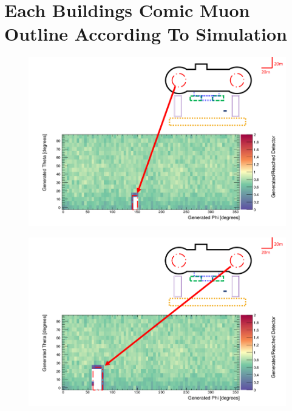 
\chapter{Each Buildings Comic Muon Outline According To Simulation}

\begin{figure}[htbp]
 \centering
 \includegraphics[width=\linewidth]{Chapter5/Figs/wylfaRasterNew/reactorCoreFarGen_Reached.png}
 \label{fig:reactorCoreFarGen_Reached}
\end{figure}

\begin{figure}[htbp]
 \centering
 \includegraphics[width=\linewidth]{Chapter5/Figs/wylfaRasterNew/reactorCoreNearGen_Reached.png}
 \label{fig:reactorCoreNearGen_Reached}
\end{figure}

